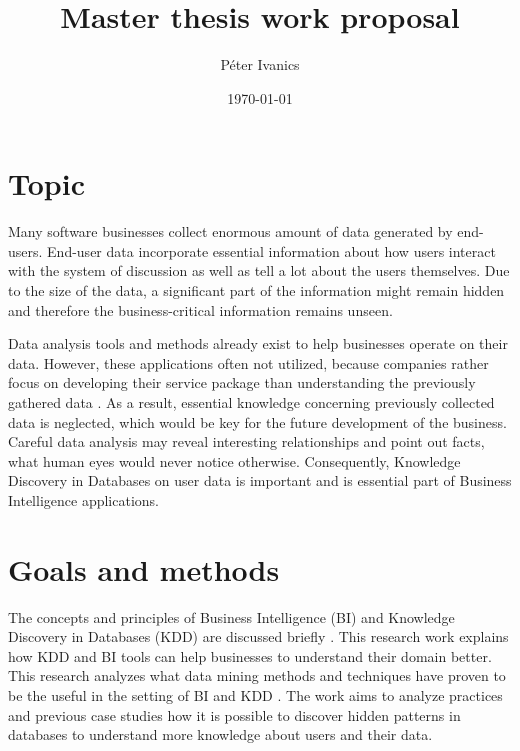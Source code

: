 \documentclass[english]{tktltiki}
\begin{document}
\onehalfspacing

\title{Master thesis work proposal}
\author{P\'eter Ivanics}
\date{\today}

\maketitle

%
%
%
\mytableofcontents

\section{Topic}
	Many software businesses collect enormous amount of data generated by end-users. End-user data incorporate essential information about how users interact with the system of discussion as well as tell a lot about the users themselves. Due to the size of the data, a significant part of the information might remain hidden and therefore the business-critical information remains unseen. 
	
	Data analysis tools and methods already exist to help businesses operate on their data. However, these applications often not utilized, because companies rather focus on developing their service package than understanding the previously gathered data \cite{inmon2007tapping}. As a result, essential knowledge concerning previously collected data is neglected, which would be key for the future development of the business. Careful data analysis may reveal interesting relationships and point out facts, what human eyes would never notice otherwise. Consequently, Knowledge Discovery in Databases on user data is important and is essential part of Business Intelligence applications. 

\section{Goals and methods}
	The concepts and principles of Business Intelligence (BI) and Knowledge Discovery in Databases (KDD) are discussed briefly \cite{data_mining_and_knowledge_discovery}. This research work explains how KDD and BI tools can help businesses to understand their domain better. This research analyzes what data mining methods and techniques have proven to be the useful in the setting of BI and KDD \cite{bose2001business}. The work aims to analyze practices and previous case studies how it is possible to discover hidden patterns in databases to understand more knowledge about users and their data. 
	
\end{document}
